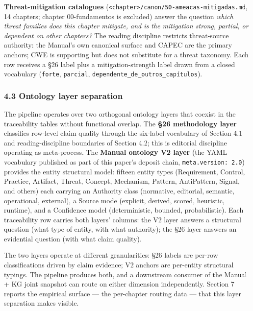 \documentclass[
]{article}
\begin{document}
\textbf{Threat-mitigation catalogues}
(\texttt{\textless{}chapter\textgreater{}/canon/50-ameacas-mitigadas.md},
14 chapters; chapter 00-fundamentos is excluded) answer the question
\emph{which threat families does this chapter mitigate, and is the
mitigation strong, partial, or dependent on other chapters?} The reading
discipline restricts threat-source authority: the Manual's own canonical
surface and CAPEC are the primary anchors; CWE is supporting but does
not substitute for a threat taxonomy. Each row receives a §26 label plus
a mitigation-strength label drawn from a closed vocabulary
(\texttt{forte}, \texttt{parcial},
\texttt{dependente\_de\_outros\_capítulos}).

\subsubsection{4.3 Ontology layer
separation}\label{ontology-layer-separation}

The pipeline operates over two orthogonal ontology layers that coexist
in the traceability tables without functional overlap. The \textbf{§26
methodology layer} classifies row-level claim quality through the
six-label vocabulary of Section 4.1 and reading-discipline boundaries of
Section 4.2; this is editorial discipline operating as meta-process. The
\textbf{Manual ontology V2 layer} (the YAML vocabulary published as part
of this paper's deposit chain,
\texttt{meta.version:\ \textquotesingle{}2.0\textquotesingle{}})
provides the entity structural model: fifteen entity types (Requirement,
Control, Practice, Artifact, Threat, Concept, Mechanism, Pattern,
AntiPattern, Signal, and others) each carrying an Authority class
(normative, editorial, semantic, operational, external), a Source mode
(explicit, derived, scored, heuristic, runtime), and a Confidence model
(deterministic, bounded, probabilistic). Each traceability row carries
both layers' columns: the V2 layer answers a structural question (what
type of entity, with what authority); the §26 layer answers an
evidential question (with what claim quality).

The two layers operate at different granularities: §26 labels are
per-row classifications driven by claim evidence; V2 anchors are
per-entity structural typings. The pipeline produces both, and a
downstream consumer of the Manual + KG joint snapshot can route on
either dimension independently. Section 7 reports the empirical surface
--- the per-chapter routing data --- that this layer separation makes
visible.
\end{document}
